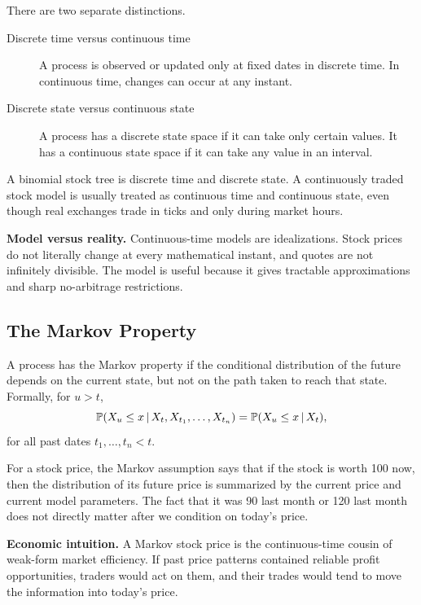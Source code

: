 There are two separate distinctions.
\begin{description}
    \item[Discrete time versus continuous time] A process is observed or updated
    only at fixed dates in discrete time. In continuous time, changes can occur
    at any instant.
    \item[Discrete state versus continuous state] A process has a discrete state
    space if it can take only certain values. It has a continuous state space if
    it can take any value in an interval.
\end{description}

A binomial stock tree is discrete time and discrete state. A continuously
traded stock model is usually treated as continuous time and continuous state,
even though real exchanges trade in ticks and only during market hours.

\begin{boxD}
\textbf{Model versus reality.} Continuous-time models are idealizations. Stock
prices do not literally change at every mathematical instant, and quotes are
not infinitely divisible. The model is useful because it gives tractable
approximations and sharp no-arbitrage restrictions.
\end{boxD}

\subsection{The Markov Property}

\begin{defN}
A process has the Markov property if the conditional distribution of the future
depends on the current state, but not on the path taken to reach that state.
Formally, for $u>t$,
\[
    \mathbb{P}(X_u \leq x \,|\, X_t, X_{t_1},\ldots,X_{t_n})
    =
    \mathbb{P}(X_u \leq x \,|\, X_t),
\]
for all past dates $t_1,\ldots,t_n<t$.
\end{defN}

For a stock price, the Markov assumption says that if the stock is worth 100
now, then the distribution of its future price is summarized by the current
price and current model parameters. The fact that it was 90 last month or 120
last month does not directly matter after we condition on today's price.

\begin{boxF}
\textbf{Economic intuition.} A Markov stock price is the continuous-time cousin
of weak-form market efficiency. If past price patterns contained reliable
profit opportunities, traders would act on them, and their trades would tend to
move the information into today's price.
\end{boxF}

